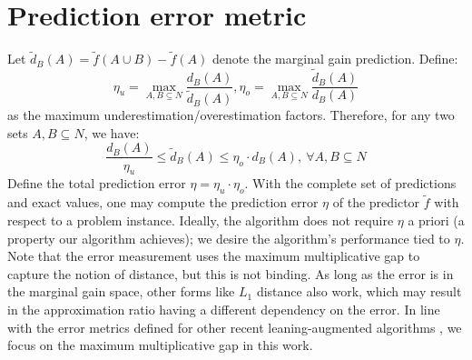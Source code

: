 \section{Prediction error metric} \label{sec:prediction error metric}

Let $\tilde{d}_B(A) = \tilde{f}(A \cup B) - \tilde{f}(A)$ denote the marginal gain prediction. Define:
\[\eta_u = \max_{A,B \subseteq N}{\frac{d_B(A)}{\tilde{d}_B(A)}}, \eta_o = \max_{A,B \subseteq N}{\frac{\tilde{d}_B(A)}{d_B(A)}}\] 
as the maximum underestimation/overestimation factors. Therefore, for any two sets $A, B \subseteq N$, we have:
\[ \frac{d_B(A)}{\eta_u} \leq \tilde{d}_B(A) \leq \eta_o \cdot d_B(A), ~\forall A, B \subseteq N \]
Define the total prediction error $\eta = \eta_u \cdot \eta_o$. 
With the complete set of predictions and exact values, one may compute the prediction error $\eta$ of the predictor $\tilde{f}$ with respect to a problem instance. Ideally, the algorithm does not require $\eta$ a priori (a property our algorithm achieves); we desire the algorithm's performance tied to $\eta$. Note that the error measurement uses the maximum multiplicative gap to capture the notion of distance, but this is not binding. As long as the error is in the marginal gain space, other forms like $L_1$ distance also work, which may result in the approximation ratio having a different dependency on the error. In line with the error metrics defined for other recent leaning-augmented algorithms \cite{SchedulingViaWeights, FlowTimeScheduling, RealTimeSchedulingwithPredictions}, we focus on the maximum multiplicative gap in this work.


